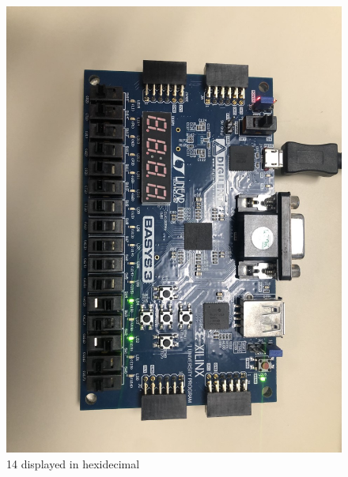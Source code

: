\documentclass[11pt]{article}
\begin{document}
\begin{figure}[ht]\centering
	\includegraphics[width= \textwidth ]{bb1.png}
	\caption{14 displayed in hexidecimal}
	\label{fig: bb1}
\end{figure}
\end{document}
